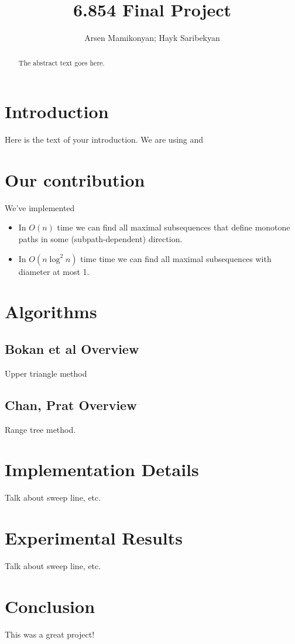 \documentclass{article}
\begin{document}
\title{6.854 Final Project}
\author{Arsen Mamikonyan; Hayk Saribekyan}


\maketitle

\begin{abstract}
The abstract text goes here.
\end{abstract}

\section{Introduction}
Here is the text of your introduction.
We are using \cite{bokal_et_al:LIPIcs:2015:5113} and \cite{chan_et_al:LIPIcs:2016:5920}

\section{Our contribution}
We've implemented
\begin{itemize}
\item In $O(n)$ time  we  can  find  all  maximal  subsequences  that  define  monotone  paths  in  some (subpath-dependent) direction. \cite{bokal_et_al:LIPIcs:2015:5113} 
\item In $O(n \log^2 n)$ time time we can find all maximal subsequences with diameter at most 1. \cite{chan_et_al:LIPIcs:2016:5920}
\end{itemize}

\section{Algorithms}
\subsection{Bokan et al Overview}
Upper triangle method

\subsection{Chan, Prat Overview}
Range tree method.

\section{Implementation Details}
Talk about sweep line, etc.

\section{Experimental Results}
Talk about sweep line, etc.

\section{Conclusion}
This was a great project!



\end{document}
